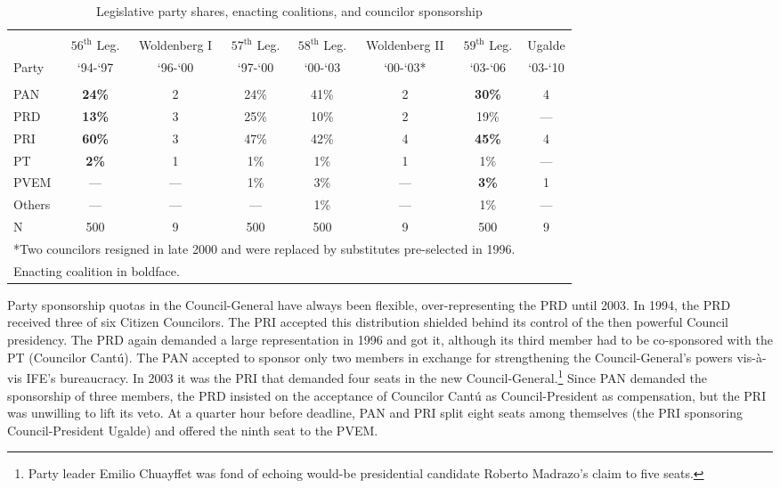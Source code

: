 \documentclass[12 pt, letter]{article}
\begin{document}
\begin{sidewaystable}
\caption{Legislative party shares, enacting coalitions, and
councilor sponsorship}\label{T:proposals}
\begin{center}
\begin{tabular}{lccccccc}
\hline\\ [-1.5ex]
      & $56^{\text{th}}$ Leg. & Woldenberg I & $57^{\text{th}}$ Leg. & $58^{\text{th}}$ Leg. & Woldenberg II & $59^{\text{th}}$ Leg. & Ugalde \\
Party &  `94-`97  &  `96-`00  &  `97-`00  &  `00-`03  &  `00-`03*  &  `03-`06  &  `03-`10 \\
\hline\\ [-1ex]
 PAN  & \textbf{24\%} & 2   & 24\% & 41\% & 2   & \textbf{30\%} & 4   \\
 PRD  & \textbf{13\%} & 3   & 25\% & 10\% & 2   & 19\%          & --- \\
 PRI  & \textbf{60\%} & 3   & 47\% & 42\% & 4   & \textbf{45\%} & 4   \\
 PT   & \textbf{ 2\%} & 1   &  1\% &  1\% & 1   & 1\%           & --- \\
 PVEM & ---           & --- &  1\% &  3\% & --- & \textbf{3\%}  & 1   \\
 Others & ---         & --- &  --- &  1\% & --- & 1\%           & --- \\
 N    & 500           & 9   &  500 &  500 & 9   & 500           & 9   \\
\hline
\multicolumn{7}{l}{\footnotesize{*Two councilors resigned in late 2000 and were replaced by substitutes pre-selected in 1996.}}\\
\multicolumn{7}{l}{\footnotesize{Enacting coalition in boldface.}}\\
\end{tabular}
\end{center}
\end{sidewaystable}

Party sponsorship quotas in the Council-General have always been
flexible, over-representing the PRD until 2003.  In 1994, the PRD
received three of six Citizen Councilors.  The PRI accepted this
distribution shielded behind its control of the then powerful
Council presidency.  The PRD again demanded a large representation
in 1996 and got it, although its third member had to be co-sponsored
with the PT (Councilor Cant\'u).  The PAN accepted to sponsor only
two members in exchange for strengthening the Council-General's
powers vis-\`{a}-vis IFE's bureaucracy.  In 2003 it was the PRI that
demanded four seats in the new Council-General.\footnote{Party
leader Emilio Chuayffet was fond of echoing would-be presidential
candidate Roberto Madrazo's claim to five seats.}  Since PAN
demanded the sponsorship of three members, the PRD insisted on the
acceptance of Councilor Cant\'u as Council-President as
compensation, but the PRI was unwilling to lift its veto.  At a
quarter hour before deadline, PAN and PRI split eight seats among
themselves (the PRI sponsoring Council-President Ugalde) and offered
the ninth seat to the PVEM.
\end{document}
